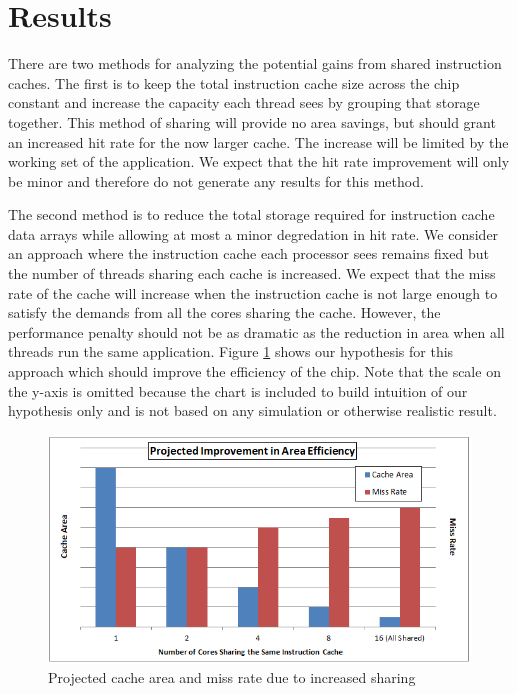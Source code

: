 \section{Results}

There are two methods for analyzing the potential gains from shared
instruction caches.
The first is to keep the total instruction cache size across the chip
constant and increase the capacity each thread sees by grouping that
storage together.
This method of sharing will provide no area savings, but should grant
an increased hit rate for the now larger cache.
The increase will be limited by the working set of the application.
We expect that the hit rate improvement will only be minor and
therefore do not generate any results for this method.


The second method is to reduce the total storage required for
instruction cache data arrays while allowing at most a minor
degredation in hit rate.
We consider an approach where the instruction cache each processor
sees remains fixed but the number of threads sharing each cache is
increased. 
We expect that the miss rate of the cache will increase when the instruction
cache is not large enough to satisfy the demands from all the cores
sharing the cache.
However, the performance penalty should not be as dramatic as the
reduction in area when all threads run the same application.
Figure \ref{AreaEff} shows our hypothesis for this approach
which should improve the efficiency of the chip.
Note that the scale on the y-axis is omitted because the chart is included
to build intuition of our hypothesis only and is not based on 
any simulation or otherwise realistic result.

\begin{figure}
\centering
\includegraphics[width=\columnwidth]{graphics/AreaEff.png}
\caption{Projected cache area and miss rate due to increased sharing }
\label{AreaEff}
\end{figure}


